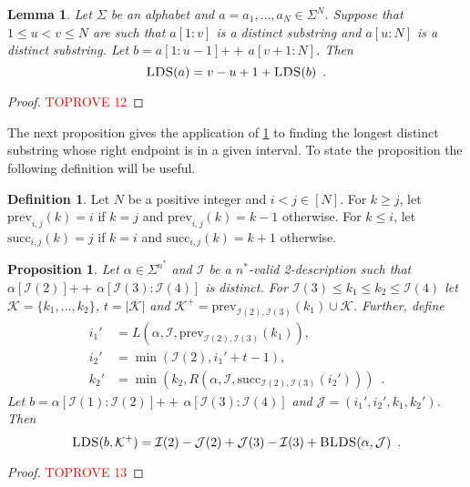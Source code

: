 \documentclass[12pt]{article}
\newcommand{\concat}{\ensuremath{+\!\!\!\!+\,}}
\newcommand{\Iset}{\mathcal{I}}
\newcommand{\Jset}{\mathcal{J}}
\newcommand{\Kset}{\mathcal{K}}
\newcommand{\blds}{\textsc{BLDS}}
\newcommand{\prev}{\mathrm{prev}}
\newcommand{\suc}{\mathrm{succ}}
\newcommand{\upto}{\mathbin{:}}
\newcommand{\lds}{\textsc{LDS}}
\newtheorem{lemma}[theorem]{Lemma}
\newtheorem{proposition}[theorem]{Proposition}
\theoremstyle{definition}
\newtheorem{definition}[theorem]{Definition}
\begin{document}
\begin{lemma}
\label{lem:lds}
Let $\Sigma$ be an alphabet and $a = a_1, \ldots, a_N \in \Sigma^N$. 
Suppose that $1 \leq u < v \leq N$ are such that $a[1\upto v]$ is a distinct substring and $a[u \upto N]$ is a distinct substring.  
Let $b = a[1\upto u-1] \concat a[v+1\upto N]$.  Then
\[
\lds(a) = v - u + 1 + \lds(b) \enspace .
\]
\end{lemma}


\begin{proof}\textcolor{red}{TOPROVE 12}\end{proof}

The next proposition gives the application of \cref{lem:lds} to finding the longest distinct substring whose right endpoint is in a given interval.
To state the proposition the following definition will be useful.
\begin{definition}
Let $N$ be a positive integer and $i < j \in [N]$.
For $k \ge j$, let $\prev_{i, j}(k) = i$ if $k = j$ and $\prev_{i, j}(k) = k-1$ otherwise.  For $k \le i$, let $\suc_{i, j}(k) = j$ if $k = i$ and $\suc_{i, j}(k) = k+1$ otherwise.
\end{definition}

\begin{proposition}
\label{prop:blds}
Let $\alpha \in \Sigma^{n^*}$ and $\Iset$ be a $n^*$-valid 2-description such that $\alpha[\Iset(2)] \concat \alpha[\Iset(3) \upto \Iset(4)]$ is distinct.
For $\Iset(3) \le k_1 \le k_2 \le \Iset(4)$ let $\Kset = \{k_1, \ldots, k_2\}$, $t = |\Kset|$ and $\Kset^+ = \prev_{\Iset(2), \Iset(3)}(k_1) \cup \Kset$. Further, define
\begin{align*}
i_1' &= L(\alpha, \Iset, \prev_{\Iset(2), \Iset(3)}(k_1)), \\
i_2' &= \min(\Iset(2), i_1' + t - 1), \\
k_2' &= \min(k_2, R(\alpha, \Iset, \suc_{\Iset(2), \Iset(3)}(i_2'))) \enspace .
\end{align*}
Let $b = \alpha[\Iset(1) \upto \Iset(2)] \concat \alpha[\Iset(3) \upto \Iset(4)]$ and $\Jset = (i_1', i_2', k_1, k_2')$.
Then
\[
\lds(b, \Kset^+)
=  \Iset(2) - \Jset(2) + \Jset(3) - \Iset(3) + \blds(\alpha, \Jset) \enspace.
\]
\end{proposition} 

\begin{proof}\textcolor{red}{TOPROVE 13}\end{proof}
\end{document}
